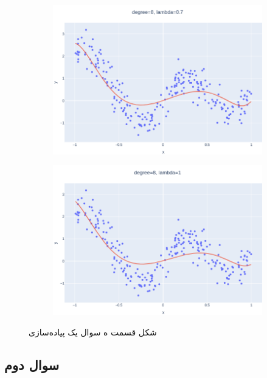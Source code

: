 \documentclass[14pt,a4]{article}
\begin{document}
\begin{figure}[h]
\begin{subfigure}{0.3\textwidth}
        \includegraphics[width=\textwidth]{images/implementation/q1/part_e/0.7.png}
    \end{subfigure}
    \hfill
    \begin{subfigure}{0.3\linewidth}
        \centering
        \includegraphics[width=\textwidth]{images/implementation/q1/part_e/1.png}
    \end{subfigure}
    \caption{شکل قسمت ه سوال یک پیاده‌سازی }
    \label{implementation-q1p6}
\end{figure}


\newpage

\subsection*{سوال دوم}
\end{document}
